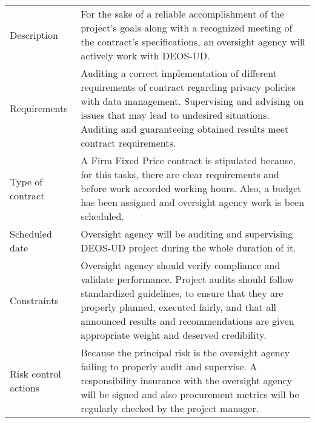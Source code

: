 \begin{table}[H]
	\centering
	\begin{tabular}{>{\raggedright\arraybackslash}p{3cm} >{\arraybackslash}p{11cm}}
		
		\toprule[2pt]
		
		\multicolumn{2}{c}{\textbf{SOW - Auditing}}\\
		
		\midrule[1.5pt]
		
		Description & For the sake of a reliable accomplishment of the project's goals along with a recognized meeting of the contract's specifications, an oversight agency will actively work with DEOS-UD.\vspace{0.2cm} \\
		
		\midrule
		
		Requirements &Auditing a correct implementation of different requirements of contract regarding privacy policies with data management. Supervising and advising on issues that may lead to undesired situations. Auditing and guaranteeing obtained results meet contract requirements.\vspace{0.2cm} \\
		
		\midrule
		
		Type of contract & A Firm Fixed Price contract is stipulated because, for this tasks, there are clear requirements and before work accorded working hours. Also, a budget has been assigned and oversight agency work is been scheduled.\vspace{0.2cm} \\
		
		\midrule
		
		Scheduled date & Oversight agency will be auditing and supervising DEOS-UD project during the whole duration of it.\vspace{0.2cm} \\
		
		\midrule
		
		Constraints & Oversight agency should verify compliance and validate performance.  Project audits should follow standardized guidelines, to ensure that they are properly planned, executed fairly, and that all announced results and recommendations are given appropriate weight and deserved credibility.\vspace{0.2cm} \\
		
		\midrule
		
		Risk control actions & Because the principal risk is the oversight agency failing to properly audit and supervise. A responsibility insurance with the oversight agency will be signed and also procurement metrics will be regularly checked by the project manager. \vspace{0.2cm} \\
		

\end{tabular}
\end{table}

